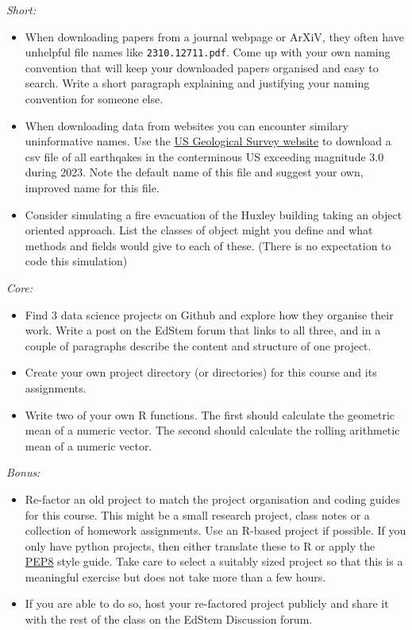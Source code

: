 \documentclass[
  letterpaper,
  DIV=11,
  numbers=noendperiod]{scrreprt}
\begin{document}
\emph{Short:}

\begin{itemize}
\item
  When downloading papers from a journal webpage or ArXiV, they often
  have unhelpful file names like \texttt{2310.12711.pdf}. Come up with
  your own naming convention that will keep your downloaded papers
  organised and easy to search. Write a short paragraph explaining and
  justifying your naming convention for someone else.
\item
  When downloading data from websites you can encounter similary
  uninformative names. Use the
  \href{https://earthquake.usgs.gov/earthquakes/search/}{US Geological
  Survey website} to download a csv file of all earthqakes in the
  conterminous US exceeding magnitude 3.0 during 2023. Note the default
  name of this file and suggest your own, improved name for this file.
\item
  Consider simulating a fire evacuation of the Huxley building taking an
  object oriented approach. List the classes of object might you define
  and what methods and fields would give to each of these. (There is no
  expectation to code this simulation)
\end{itemize}

\emph{Core:}

\begin{itemize}
\item
  Find 3 data science projects on Github and explore how they organise
  their work. Write a post on the EdStem forum that links to all three,
  and in a couple of paragraphs describe the content and structure of
  one project.
\item
  Create your own project directory (or directories) for this course and
  its assignments.
\item
  Write two of your own R functions. The first should calculate the
  geometric mean of a numeric vector. The second should calculate the
  rolling arithmetic mean of a numeric vector.
\end{itemize}

\emph{Bonus:}

\begin{itemize}
\item
  Re-factor an old project to match the project organisation and coding
  guides for this course. This might be a small research project, class
  notes or a collection of homework assignments. Use an R-based project
  if possible. If you only have python projects, then either translate
  these to R or apply the \href{https://peps.python.org/pep-0008/}{PEP8}
  style guide. Take care to select a suitably sized project so that this
  is a meaningful exercise but does not take more than a few hours.
\item
  If you are able to do so, host your re-factored project publicly and
  share it with the rest of the class on the EdStem Discussion forum.
\end{itemize}
\end{document}
